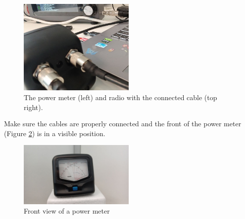 \documentclass[11pt,a4paper]{article}
\begin{document}
\begin{figure}[!ht]
  \centering
  \includegraphics[width=0.5\textwidth]{pictures/wattmeter_4-edited.jpeg}
  \caption{The power meter (left) and radio with the connected cable (top right).}
  \label{fig:backview4}
\end{figure}

Make sure the cables are properly connected and the front of the power meter (Figure \ref{fig:frontview1})
is in a visible position.

\begin{figure}[!ht]
  \centering
  \includegraphics[width=0.5\textwidth]{pictures/wattmeter_5.jpeg}
  \caption{Front view of a power meter}
  \label{fig:frontview1}
\end{figure}
\end{document}
